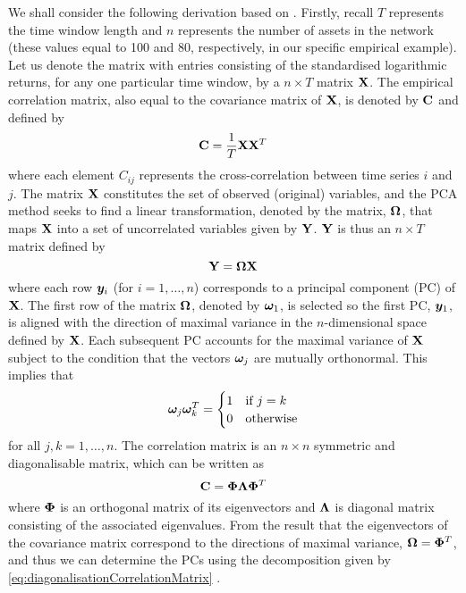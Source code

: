 We shall consider the following derivation based on \cite{Jol02,UIO03,FPM+10,FPW+11,Gil14b}.
Firstly, recall $T$ represents the time window length and $n$ represents the number of assets in the network (these values equal to 100 and 80, respectively, in our specific empirical example).
Let us denote the matrix with entries consisting of the standardised logarithmic returns, for any one particular time window, by a $n \times T$ matrix $\mathbf X$.
The empirical correlation matrix, also equal to the covariance matrix of $\mathbf X$, is denoted by $\mathbf C$ and defined by
\begin{equation}
	\label{eq:correlationMatrix}
	\mathbf C = \frac{1}{T} \mathbf X \mathbf X^{T}
\end{equation}
where each element $C_{ij}$ represents the cross-correlation between time series $i$ and $j$.
The matrix $\mathbf X$ constitutes the set of observed (original) variables, and the PCA method seeks to find a linear transformation, denoted by the matrix, $\mathbf\Omega$, that maps $\mathbf X$ into a set of uncorrelated variables given by $\mathbf Y$.
$\mathbf Y$ is thus an $n \times T$ matrix defined by
\begin{equation}
	\label{eq:uncorrelatedVariables}
	\mathbf Y = \mathbf\Omega \mathbf X 
\end{equation}
where each row $\vecvar{y}_{i}$ (for $i =1,\dots,n$) corresponds to a principal component (PC) of $\mathbf X$.
The first row of the matrix $\mathbf\Omega$, denoted by $\vecvar{\omega}_{1}$, is selected so the first PC, $\vecvar{y}_{1}$, is aligned with the direction of maximal variance in the $n$-dimensional space defined by $\mathbf X$.
Each subsequent PC accounts for the maximal variance of $\mathbf X$ subject to the condition that the vectors $\vecvar{\omega}_{j}$ are mutually orthonormal.
This implies that
\begin{equation}
	\label{eq:PCCoefficients}
	 \vecvar{\omega}_{j} \transpose{\vecvar{\omega}_{k}} =
	\begin{cases}
		1 & \text{if } j = k\\
		0 & \text{otherwise}
	\end{cases}
\end{equation}
for all $j,k = 1,\dots,n$.
The correlation matrix is an $n \times n$ symmetric and diagonalisable matrix, which can be written as 
\begin{equation}
	\label{eq:diagonalisationCorrelationMatrix}
	\mathbf C = \mathbf\Phi \mathbf\Lambda \mathbf\Phi^{T}
\end{equation}
where $\mathbf\Phi$ is an orthogonal matrix of its eigenvectors and $\mathbf\Lambda$ is diagonal matrix consisting of the associated eigenvalues.
From the result that the eigenvectors of the covariance matrix correspond to the directions of maximal variance, $\mathbf\Omega = \mathbf\Phi^{T}$, and thus we can determine the PCs using the decomposition given by \cref{eq:diagonalisationCorrelationMatrix} \cite{Jol02}.

